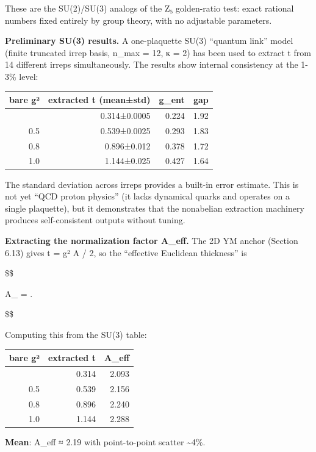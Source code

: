 \documentclass[11pt,a4paper]{article}
\theoremstyle{remark}
\begin{document}
These are the SU(2)/SU(3) analogs of the Z₅ golden-ratio test: exact
rational numbers fixed entirely by group theory, with no adjustable parameters.

\textbf{Preliminary SU(3) results.} A one-plaquette SU(3) ``quantum link'' model
(finite truncated irrep basis, n\_max = 12, κ = 2) has been used to
extract t from 14 different irreps simultaneously. The results show internal
consistency at the 1-3\% level:

{\def\LTcaptype{none} %
\begin{longtable}[]{@{}rrrr@{}}
\toprule\noalign{}
bare g² & extracted t (mean±std) & g\_ent & gap \\
\midrule\noalign{}
\endhead
\bottomrule\noalign{}
\endlastfoot
0.3 & 0.314±0.0005 & 0.224 & 1.92 \\
0.5 & 0.539±0.0025 & 0.293 & 1.83 \\
0.8 & 0.896±0.012 & 0.378 & 1.72 \\
1.0 & 1.144±0.025 & 0.427 & 1.64 \\
\end{longtable}
}

The standard deviation across irreps provides a built-in error estimate. This is
not yet ``QCD proton physics'' (it lacks dynamical quarks and operates on a single
plaquette), but it demonstrates that the nonabelian extraction machinery produces
self-consistent outputs without tuning.

\textbf{Extracting the normalization factor A\_eff.} The 2D YM anchor
(Section 6.13) gives t = g² A / 2, so the ``effective Euclidean thickness'' is

\$\$

A\_ = .

\$\$

Computing this from the SU(3) table:

{\def\LTcaptype{none} %
\begin{longtable}[]{@{}rrr@{}}
\toprule\noalign{}
bare g² & extracted t & A\_eff \\
\midrule\noalign{}
\endhead
\bottomrule\noalign{}
\endlastfoot
0.3 & 0.314 & 2.093 \\
0.5 & 0.539 & 2.156 \\
0.8 & 0.896 & 2.240 \\
1.0 & 1.144 & 2.288 \\
\end{longtable}
}

\textbf{Mean}: A\_eff ≈ 2.19 with point-to-point scatter \textasciitilde4\%.
\end{document}
